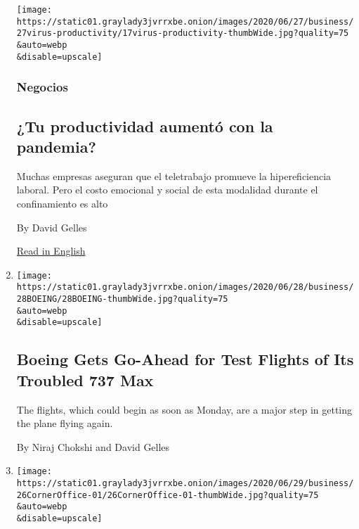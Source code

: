 \begin{enumerate}
  \texttt{[image: https://static01.graylady3jvrrxbe.onion/images/2020/06/27/business/27virus-productivity/17virus-productivity-thumbWide.jpg?quality=75\\\&auto=webp\\\&disable=upscale]}

  \hypertarget{negocios}{%
  \subsubsection{Negocios}\label{negocios}}

  \hypertarget{tu-productividad-aumentuxf3-con-la-pandemia}{%
  \subsection{¿Tu productividad aumentó con la
  pandemia?}\label{tu-productividad-aumentuxf3-con-la-pandemia}}

  Muchas empresas aseguran que el teletrabajo promueve la
  hipereficiencia laboral. Pero el costo emocional y social de esta
  modalidad durante el confinamiento es alto

  By David Gelles

  \href{https://www.nytimes3xbfgragh.onion/2020/06/23/business/working-from-home-productivity.html}{Read
  in English}
\item
  \href{/2020/06/28/business/boeing-737-max-faa.html}{}

  \texttt{[image: https://static01.graylady3jvrrxbe.onion/images/2020/06/28/business/28BOEING/28BOEING-thumbWide.jpg?quality=75\\\&auto=webp\\\&disable=upscale]}

  \hypertarget{boeing-gets-go-ahead-for-test-flights-of-its-troubled-737-max}{%
  \subsection{Boeing Gets Go-Ahead for Test Flights of Its Troubled 737
  Max}\label{boeing-gets-go-ahead-for-test-flights-of-its-troubled-737-max}}

  The flights, which could begin as soon as Monday, are a major step in
  getting the plane flying again.

  By Niraj Chokshi and David Gelles
\item
  \href{/2020/06/26/business/feeding-america-Claire-Babineaux-Fontenot.html}{}

  \texttt{[image: https://static01.graylady3jvrrxbe.onion/images/2020/06/29/business/26CornerOffice-01/26CornerOffice-01-thumbWide.jpg?quality=75\\\&auto=webp\\\&disable=upscale]}

  \hypertarget{corner-office-3}{%
}
\end{enumerate}
